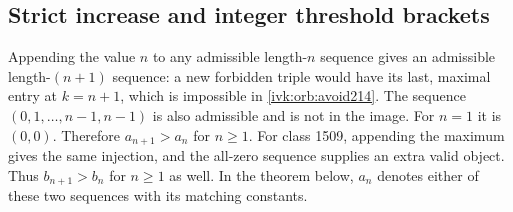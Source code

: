 \documentclass[11pt,letterpaper]{article}
\theoremstyle{remark}\newtheorem{remark}[theorem]{Remark}
\begin{document}
\subsection{Strict increase and integer threshold brackets}
Appending the value $n$ to any admissible length-$n$ sequence gives
an admissible length-$(n+1)$ sequence: a new forbidden triple would
have its last, maximal entry at $k=n+1$, which is impossible in
\eqref{ivk:orb:avoid214}. The sequence
$(0,1,\ldots,n-1,n-1)$ is also admissible and is not in the image.
For $n=1$ it is $(0,0)$. Therefore $a_{n+1}>a_n$ for $n\ge1$.
For class 1509, appending the maximum gives the same injection,
and the all-zero sequence supplies an extra valid object. Thus
$b_{n+1}>b_n$ for $n\ge1$ as well. In the theorem below, $a_n$
denotes either of these two sequences with its matching constants.
\end{document}

